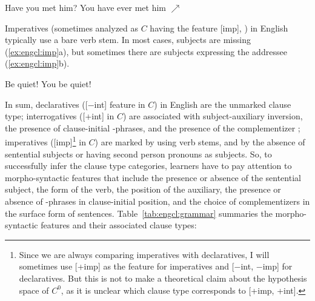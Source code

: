 
\bxl
\ex Have you  met him?
\ex *You have ever met him $\nearrow$
\exl
\eex


Imperatives (sometimes analyzed as $C$ having the feature [imp], \cite{platzack1997imp}) in English typically use a bare verb stem. In most cases, subjects are missing (\ref{ex:engcl:imp}a), but sometimes there are subjects expressing the addressee (\ref{ex:engcl:imp}b).

\bxl{}
Be quiet!
\ex You be quiet!
\exl
\eex


In sum, declaratives ([$-$int] feature in $C$) in English are the unmarked clause type; interrogatives ([+int] in $C$) are associated with subject-auxiliary inversion, the presence of clause-initial \twh-phrases, and the presence of the complementizer ; imperatives ([imp]\footnote{Since we are always comparing imperatives with declaratives, I will sometimes use [+imp] as the feature for imperatives and [$-$int, $-$imp] for declaratives. But this is not to make a theoretical claim about the hypothesis space of $C^{0}$, as it is unclear which clause type corresponds to [+imp, +int].} in $C$) are marked by using verb stems, and by the absence of sentential subjects or having second person pronouns as subjects. So, to successfully infer the clause type categories, learners have to pay attention to morpho-syntactic features that include the presence or absence of the sentential subject, the form of the verb, the position of the auxiliary, the presence or absence of \twh-phrases in clause-initial position, and the choice of complementizers in the surface form of sentences. Table~\ref{tab:engcl:grammar} summaries the morpho-syntactic features and their associated clause types:


